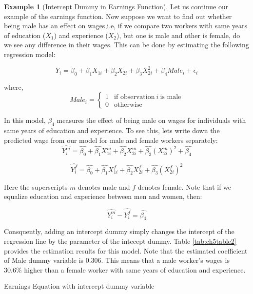 \documentclass[
]{book}
\theoremstyle{definition}
\theoremstyle{definition}
\newtheorem{example}{Example}[chapter]
\theoremstyle{definition}
\theoremstyle{definition}
\theoremstyle{remark}
\begin{document}
\begin{example}[Intercept Dummy in Earnings Function]
\protect\hypertarget{exm:unnamed-chunk-84}{}\label{exm:unnamed-chunk-84}Let us continue our example of the earnings function. Now suppose we want to find out whether being male has an effect on wages,i.e, if we compare two workers with same years of education (\(X_{1}\)) and experience (\(X_2\)), but one is male and other is female, do we see any difference in their wages. This can be done by estimating the following regression model:

\[Y_i= \beta_0 + \beta_1 X_{1i} + \beta_2 X_{2i} + \beta_3 X_{2i}^2 + \beta_4 Male_i+ \epsilon_i\]

where, \[Male_i= \begin{cases}
1 & \text{if observation} \ i \ \text{is male} \\
0 & \text{otherwise}
\end{cases}\]

In this model, \(\beta_4\) measures the effect of being male on wages for individuals with same years of education and experience. To see this, lets write down the predicted wage from our model for male and female workers separately:\[\widehat{Y^m_i}=\widehat{\beta_0} + \widehat{\beta_1} X^m_{1i} + \widehat{\beta_2} X^m_{2i} + \widehat{\beta_3} (X^m_{2i})^2 + \widehat{\beta_4}\]

\[\widehat{Y^f_i}= \widehat{\beta_0} + \widehat{\beta_1} X^f_{1i} + \widehat{\beta_2} X^f_{2i} + \widehat{\beta_3} (X^f_{2i})^2\]

Here the superscripts \(m\) denotes male and \(f\) denotes female. Note that if we equalize education and experience between men and women, then:

\[\widehat{Y^m_i}-\widehat{Y^f_i}=\widehat{\beta_4}\]

Consquently, adding an intercept dummy simply changes the intercept of the regression line by the parameter of the intecept dummy. Table \ref{tab:ch5table2} provides the estimation results for this model. Note that the estimated coefficient of Male dummy variable is 0.306. This means that a male worker's wages is 30.6\% higher than a female worker with same years of education and experience.
\end{example}

\label{tab:ch5table2} Earnings Equation with intercept dummy variable
\end{document}
